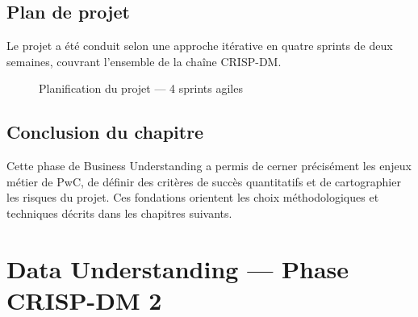 \documentclass[12pt,a4paper,twoside]{report}
\theoremstyle{definition}
\begin{document}
\section{Plan de projet}

Le projet a été conduit selon une approche itérative en quatre sprints de deux
semaines, couvrant l'ensemble de la chaîne CRISP-DM.

\begin{figure}[H]
\centering
{}
\caption{Planification du projet — 4 sprints agiles}
\label{fig:sprints}
\end{figure}

\section{Conclusion du chapitre}

Cette phase de Business Understanding a permis de cerner précisément les enjeux
métier de PwC, de définir des critères de succès quantitatifs et de cartographier
les risques du projet. Ces fondations orientent les choix méthodologiques et
techniques décrits dans les chapitres suivants.

\chapter{Data Understanding — Phase CRISP-DM 2}
\label{chap:dataunderstanding}
\end{document}
